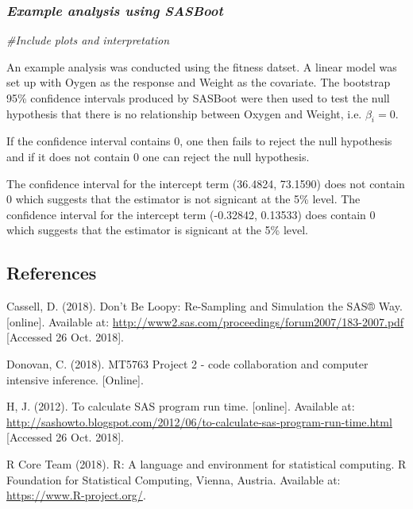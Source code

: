 \documentclass[]{article}
\newenvironment{Shaded}{\begin{snugshade}}{\end{snugshade}}
\newcommand{\CommentTok}[1]{\textcolor[rgb]{0.56,0.35,0.01}{\textit{#1}}}
\begin{document}
\subsubsection{\texorpdfstring{\emph{Example analysis using
SASBoot}}{Example analysis using SASBoot}}\label{example-analysis-using-sasboot}

\begin{Shaded}
\begin{Highlighting}[]
\CommentTok{#Include plots and interpretation}
\end{Highlighting}
\end{Shaded}

An example analysis was conducted using the fitness datset. A linear
model was set up with Oygen as the response and Weight as the covariate.
The bootstrap 95\% confidence intervals produced by SASBoot were then
used to test the null hypothesis that there is no relationship between
Oxygen and Weight, i.e. \(\beta_i = 0\).

If the confidence interval contains 0, one then fails to reject the null
hypothesis and if it does not contain 0 one can reject the null
hypothesis.

The confidence interval for the intercept term (36.4824, 73.1590) does
not contain 0 which suggests that the estimator is not signicant at the
5\% level. The confidence interval for the intercept term (-0.32842,
0.13533) does contain 0 which suggests that the estimator is signicant
at the 5\% level.

\pagebreak 

\subsection{References}\label{references}

Cassell, D. (2018). Don't Be Loopy: Re-Sampling and Simulation the SAS®
Way. {[}online{]}. Available at:
\url{http://www2.sas.com/proceedings/forum2007/183-2007.pdf} {[}Accessed
26 Oct. 2018{]}.

Donovan, C. (2018). MT5763 Project 2 - code collaboration and computer
intensive inference. {[}Online{]}.

H, J. (2012). To calculate SAS program run time. {[}online{]}. Available
at:
\url{http://sashowto.blogspot.com/2012/06/to-calculate-sas-program-run-time.html}
{[}Accessed 26 Oct. 2018{]}.

R Core Team (2018). R: A language and environment for statistical
computing. R Foundation for Statistical Computing, Vienna, Austria.
Available at: \url{https://www.R-project.org/}.
\end{document}
